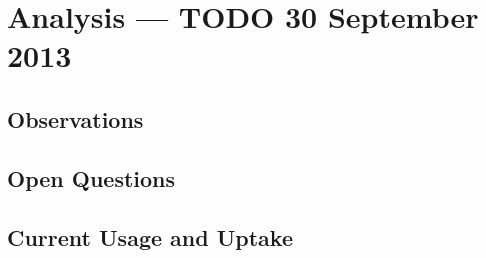 \section{Analysis --- TODO 30 September 2013}

\subsection{Observations}

\subsection{Open Questions}

\subsection{Current Usage and Uptake}
